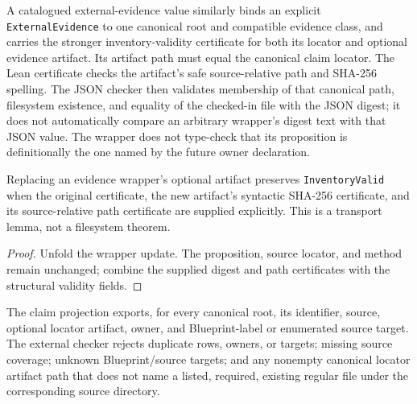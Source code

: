 \begin{definition}
  \label{def:catalogued-external-evidence}
  \leanok
  A catalogued external-evidence value similarly binds an explicit
  \texttt{ExternalEvidence} to one canonical root and compatible evidence
  class, and carries the stronger inventory-validity certificate for both its
  locator and optional evidence artifact.  Its artifact path must equal the
  canonical claim locator.  The Lean certificate checks the artifact's safe
  source-relative path and SHA-256 spelling.  The JSON checker then validates
  membership of that canonical path, filesystem existence, and equality of the
  checked-in file with the JSON digest; it does not automatically compare an
  arbitrary wrapper's digest text with that JSON value.  The wrapper does not
  type-check that its proposition is definitionally the one named by the
  future owner declaration.
\end{definition}

\begin{theorem}
  \label{thm:inventory-valid-artifact-transport}
  \leanok
  Replacing an evidence wrapper's optional artifact preserves
  \texttt{InventoryValid} when the original certificate, the new artifact's
  syntactic SHA-256 certificate, and its source-relative path certificate are
  supplied explicitly.  This is a transport lemma, not a filesystem theorem.
\end{theorem}

\begin{proof}
  Unfold the wrapper update.  The proposition, source locator, and method
  remain unchanged; combine the supplied digest and path certificates with the
  structural validity fields.
  \leanok
\end{proof}

\begin{definition}
  \label{def:external-claim-projection}
  \leanok
  The claim projection exports, for every canonical root, its identifier,
  source, optional locator artifact, owner, and Blueprint-label or enumerated
  source target.  The external checker rejects duplicate rows, owners, or
  targets; missing source coverage; unknown Blueprint/source targets; and any
  nonempty canonical locator artifact path that does not name a listed,
  required, existing regular file under the corresponding source directory.
\end{definition}

